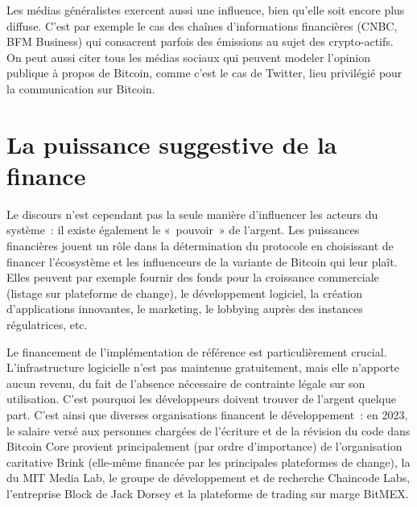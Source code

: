 Les médias généralistes exercent aussi une influence, bien qu'elle soit encore plus diffuse. C'est par exemple le cas des chaînes d'informations financières (CNBC, BFM Business) qui consacrent parfois des émissions au sujet des crypto-actifs. On peut aussi citer tous les médias sociaux qui peuvent modeler l'opinion publique à propos de Bitcoin, comme c'est le cas de Twitter, lieu privilégié pour la communication sur Bitcoin.

\vspace{-1em}
\section*{La puissance suggestive de la finance} %

Le discours n'est cependant pas la seule manière d'influencer les acteurs du système~: il existe également le «~pouvoir~» de l'argent. Les puissances financières jouent un rôle dans la détermination du protocole en choisissant de financer l'écosystème et les influenceurs de la variante de Bitcoin qui leur plaît. Elles peuvent par exemple fournir des fonds pour la croissance commerciale (listage sur plateforme de change), le développement logiciel, la création d'applications innovantes, le marketing, le lobbying auprès des instances régulatrices, etc.

Le financement de l'implémentation de référence est particulièrement crucial. L'infrastructure logicielle n'est pas maintenue gratuitement, mais elle n'apporte aucun revenu, du fait de l'absence nécessaire de contrainte légale sur son utilisation. C'est pourquoi les développeurs doivent trouver de l'argent quelque part. C'est ainsi que diverses organisations financent le développement~: en 2023, le salaire versé aux personnes chargées de l'écriture et de la révision du code dans Bitcoin Core provient principalement (par ordre d'importance) de l'organisation caritative Brink (elle-même financée par les principales plateformes de change), la  du MIT Media Lab, le groupe de développement et de recherche Chaincode Labs, l'entreprise Block de Jack Dorsey et la plateforme de trading sur marge BitMEX.

